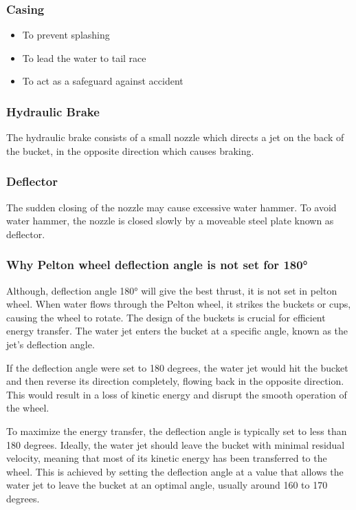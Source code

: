 \documentclass{article}
\begin{document}
\subsubsection*{Casing}
\begin{itemize}
  \item To prevent splashing 
  \item To lead the water to tail race 
  \item To act as a safeguard against accident 
\end{itemize}

\subsubsection*{Hydraulic Brake}
The hydraulic brake consists of a small nozzle which directs a jet on the back of the bucket, in the opposite direction which causes braking.

\subsubsection*{Deflector}
The sudden closing of the nozzle may cause excessive water hammer. To avoid water hammer, the nozzle is closed slowly by a moveable steel plate known as deflector. 


\subsubsection*{Why Pelton wheel deflection angle is not set for 180°}
Although, deflection angle 180° will give the best thrust, it is not set in pelton wheel. When water flows through the Pelton wheel, it strikes the buckets or cups, causing the wheel to rotate. The design of the buckets is crucial for efficient energy transfer. The water jet enters the bucket at a specific angle, known as the jet's deflection angle.

If the deflection angle were set to 180 degrees, the water jet would hit the bucket and then reverse its direction completely, flowing back in the opposite direction. This would result in a loss of kinetic energy and disrupt the smooth operation of the wheel.

To maximize the energy transfer, the deflection angle is typically set to less than 180 degrees. Ideally, the water jet should leave the bucket with minimal residual velocity, meaning that most of its kinetic energy has been transferred to the wheel. This is achieved by setting the deflection angle at a value that allows the water jet to leave the bucket at an optimal angle, usually around 160 to 170 degrees.
\end{document}

